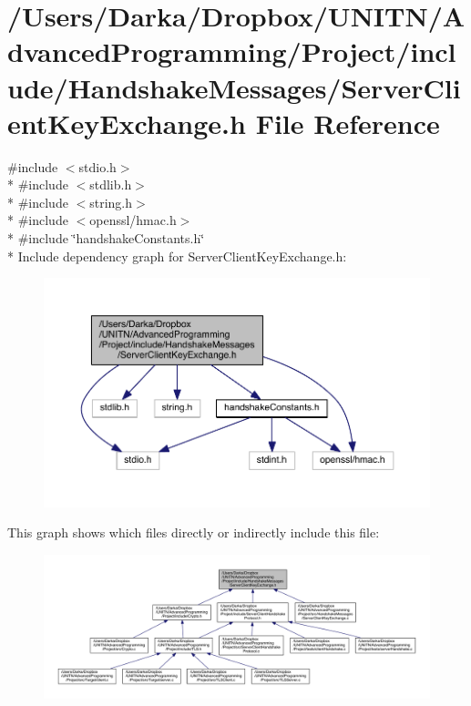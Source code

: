 \section{/\+Users/\+Darka/\+Dropbox/\+U\+N\+I\+T\+N/\+Advanced\+Programming/\+Project/include/\+Handshake\+Messages/\+Server\+Client\+Key\+Exchange.h File Reference}
\label{_server_client_key_exchange_8h}
{\ttfamily \#include $<$stdio.\+h$>$}\\*
{\ttfamily \#include $<$stdlib.\+h$>$}\\*
{\ttfamily \#include $<$string.\+h$>$}\\*
{\ttfamily \#include $<$openssl/hmac.\+h$>$}\\*
{\ttfamily \#include \char`\"{}handshake\+Constants.\+h\char`\"{}}\\*
Include dependency graph for Server\+Client\+Key\+Exchange.\+h\+:\nopagebreak
\begin{figure}[H]
\begin{center}
\leavevmode
\includegraphics[width=350pt]{_server_client_key_exchange_8h__incl}
\end{center}
\end{figure}
This graph shows which files directly or indirectly include this file\+:\nopagebreak
\begin{figure}[H]
\begin{center}
\leavevmode
\includegraphics[width=350pt]{_server_client_key_exchange_8h__dep__incl}
\end{center}
\end{figure}
